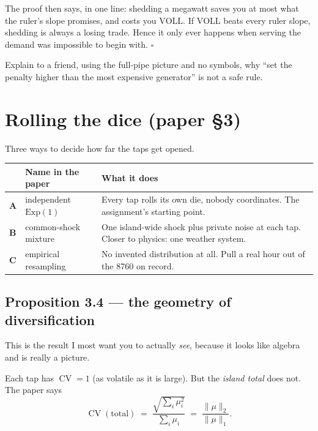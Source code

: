 \documentclass[11pt,a4paper]{article}
\newcommand{\CV}{\operatorname{CV}}
\newcommand{\VOLL}{\mathrm{VOLL}}
\begin{document}
The proof then says, in one line: shedding a megawatt saves you at most what the
ruler's slope promises, and costs you $\VOLL$. If $\VOLL$ beats every ruler
slope, shedding is always a losing trade. Hence it only ever happens when
serving the demand was impossible to begin with. $\square$

\begin{teach}
Explain to a friend, using the full-pipe picture and no symbols, why ``set the
penalty higher than the most expensive generator'' is not a safe rule.
\end{teach}

\section{Rolling the dice (paper \S3)}

Three ways to decide how far the taps get opened.

\begin{center}
\small
\begin{tabular}{@{}llp{}@{}}
\toprule
& \textbf{Name in the paper} & \textbf{What it does} \\
\midrule
\textbf{A} & independent $\mathrm{Exp}(1)$ & Every tap rolls its own die, nobody
coordinates. The assignment's starting point. \\[0.35em]
\textbf{B} & common-shock mixture & One island-wide shock plus private noise at
each tap. Closer to physics: one weather system. \\[0.35em]
\textbf{C} & empirical resampling & No invented distribution at all. Pull a real
hour out of the \num{8760} on record. \\
\bottomrule
\end{tabular}
\end{center}

\subsection{Proposition 3.4 --- the geometry of diversification}

This is the result I most want you to actually \emph{see}, because it looks like
algebra and is really a picture.

Each tap has $\CV = 1$ (as volatile as it is large). But the \emph{island total}
does not. The paper says
\[
\CV(\text{total}) \;=\; \frac{\sqrt{\sum_i \mu_i^2}}{\sum_i \mu_i}
\;=\; \frac{\lVert \mu \rVert_2}{\lVert \mu \rVert_1}.
\]
\end{document}
